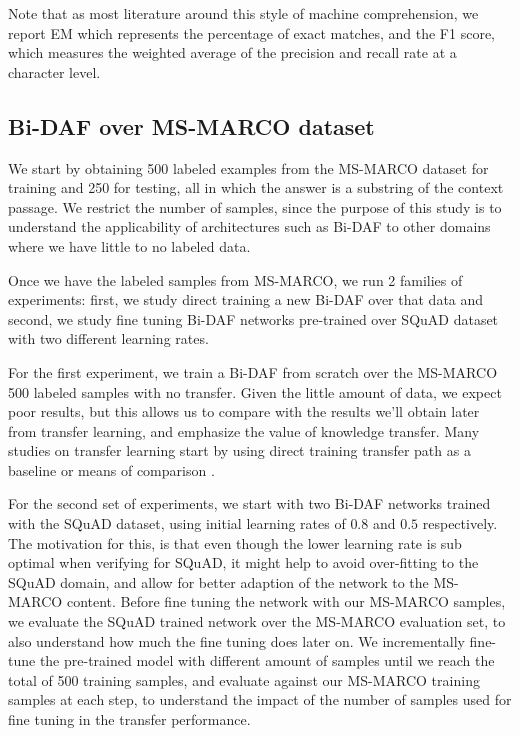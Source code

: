 \documentclass[11pt,a4paper]{article}
\begin{document}
Note that as most literature around this style of machine comprehension, we report EM which represents the percentage of exact matches, and the F1 score, which measures the weighted average of the precision and recall rate at a character level.

\subsection{Bi-DAF over MS-MARCO dataset}

We start by obtaining 500 labeled examples from the MS-MARCO dataset for training and 250 for testing, all in which the answer is a substring of the context passage. We restrict the number of samples, since the purpose of this study is to understand the applicability of architectures such as Bi-DAF to other domains where we have little to no labeled data.

Once we have the labeled samples from MS-MARCO, we run 2 families of experiments: first, we study direct training a new Bi-DAF over that data and second, we study fine tuning Bi-DAF networks pre-trained over SQuAD dataset with two different learning rates.

For the first experiment, we train a Bi-DAF from scratch over the MS-MARCO 500 labeled samples with no transfer. Given the little amount of data, we expect poor results, but this allows us to compare with the results we'll obtain later from transfer learning, and emphasize the value of knowledge transfer. Many studies on transfer learning start by using direct training transfer path as a baseline or means of comparison \cite{conneau:2017}.

For the second set of experiments, we start with two Bi-DAF networks trained with the SQuAD dataset, using initial learning rates of $0.8$ and $0.5$ respectively. The motivation for this, is that even though the lower learning rate is sub optimal when verifying for SQuAD, it might help to avoid over-fitting to the SQuAD domain, and allow for better adaption of the network to the MS-MARCO content. Before fine tuning the network with our MS-MARCO samples, we evaluate the SQuAD trained network over the MS-MARCO evaluation set, to also understand how much the fine tuning does later on. We incrementally fine-tune the pre-trained model with different amount of samples until we reach the total of 500 training samples, and evaluate against our MS-MARCO training samples at each step, to understand the impact of the number of samples used for fine tuning in the transfer performance. 
\end{document}
